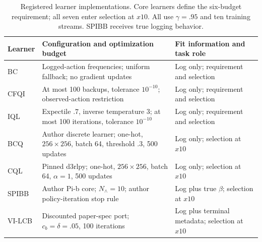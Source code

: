 \begin{table}[t]
\centering\small
\caption{Registered learner implementations. Core learners define the six-budget requirement; all seven enter selection at $x10$. All use $\gamma=.95$ and ten training streams. SPIBB receives true logging behavior.}
\label{tab:d1-learners}
\begin{tabular}{lp{}p{}}\toprule
Learner & Configuration and optimization budget & Fit information and task role\\\midrule
BC & Logged-action frequencies; uniform fallback; no gradient updates & Log only; requirement and selection\\
CFQI & At most 100 backups, tolerance $10^{-10}$; observed-action restriction & Log only; requirement and selection\\
IQL & Expectile $.7$, inverse temperature $3$; at most 100 iterations, tolerance $10^{-10}$ & Log only; requirement and selection\\
BCQ & Author discrete learner; one-hot, $256\times256$, batch 64, threshold $.3$, 500 updates & Log only; selection at $x10$\\
CQL & Pinned d3rlpy; one-hot, $256\times256$, batch 64, $\alpha=1$, 500 updates & Log only; selection at $x10$\\
SPIBB & Author Pi-b core; $N_\wedge=10$; author policy-iteration stop rule & Log plus true $\beta$; selection at $x10$\\
VI-LCB & Discounted paper-spec port; $c_b=\delta=.05$, 100 iterations & Log plus terminal metadata; selection at $x10$\\
\bottomrule\end{tabular}
\end{table}
